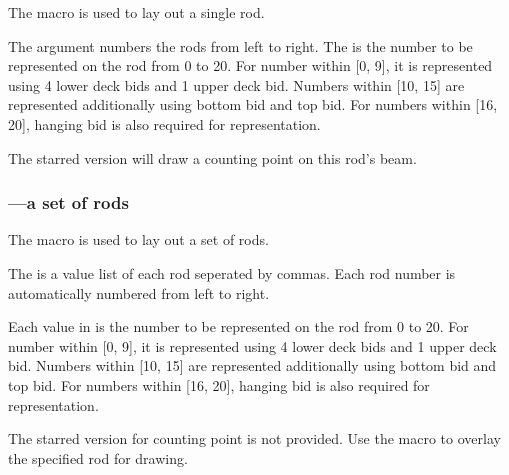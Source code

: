 \documentclass[full]{l3doc}
\begin{document}
\begin{documentation}
  The  macro is used to lay out a single rod.

  The  argument numbers the rods from left to right.
  The  is the number to be represented on the rod from
  0 to 20. For number within [0, 9], it is represented using 4 lower deck
  bids and 1 upper deck bid. Numbers within [10, 15] are represented additionally
  using bottom bid and top bid. For numbers within [16, 20], hanging bid is also
  required for representation.

  The starred version  will draw a counting point on this rod's beam.

\begin{SideBySideExample}[frame=single,numbers=left,%
    xrightmargin=.48\linewidth,gobble=2]
  \centering
  \begin{suanpan}
  \end{suanpan}
\end{SideBySideExample}

\subsubsection{---a set of rods}

\begin{function}{\rods}
  \begin{syntax}
     
  \end{syntax}
\end{function}

  The  macro is used to lay out a set of rods.

  The  is a value list of each rod seperated by commas.
  Each rod number is automatically numbered from left to right.

  Each value in  is the number to be represented on the rod from
  0 to 20. For number within [0, 9], it is represented using 4 lower deck
  bids and 1 upper deck bid. Numbers within [10, 15] are represented additionally
  using bottom bid and top bid. For numbers within [16, 20], hanging bid is also
  required for representation.

  \begin{noteen}
    The starred version  for counting point is not provided.
    Use the  macro to overlay the specified rod for drawing.
  \end{noteen}


\end{documentation}
\end{document}
